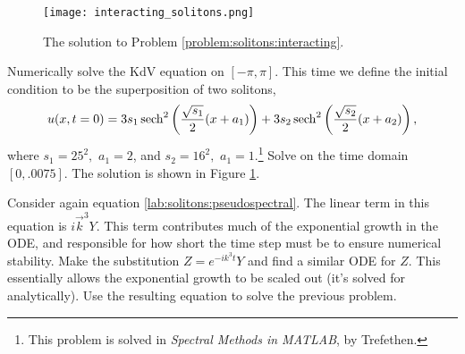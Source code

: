 \begin{figure}
\centering
\texttt{[image: interacting\_solitons.png]}
\caption{The solution to Problem \ref{problem:solitons:interacting}.}
\label{fig:solitons:interacting}
\end{figure}

\begin{problem}
Numerically solve the KdV equation on $[-\pi,\pi]$.
This time we define the initial condition 
to be the superposition of two solitons,
\[
u(x,t=0) = 3s_1\operatorname{sech}^2\left(\frac{\sqrt{s_1}}{2}(x+a_1)\right) + 3s_2\operatorname{sech}^2\left(\frac{\sqrt{s_2}}{2}(x+a_2)\right),
\]
where $s_1 = 25^2,$ $a_1 = 2$, and $s_2 = 16^2,$ $a_1 = 1$.\footnote{This problem is solved in \textit{Spectral Methods in MATLAB}, by Trefethen.}
Solve on the time domain $[0,.0075]$.
The solution is shown in Figure \ref{fig:solitons:interacting}.
\label{problem:solitons:interacting}
\end{problem}

\begin{problem}
Consider again equation \eqref{lab:solitons:pseudospectral}.
The linear term in this equation is $i\vec{k}^3Y$.
This term contributes much of the exponential growth in the ODE, and responsible for how short the time step must be to ensure numerical stability.
Make the substitution $Z = e^{-ik^3t}Y$ and find a similar ODE for $Z$.
This essentially allows the exponential growth to be scaled out (it's solved for analytically).
Use the resulting equation to solve the previous problem.
\end{problem}